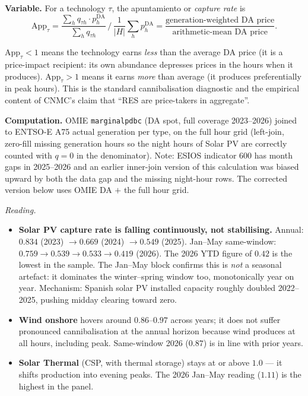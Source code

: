 \documentclass[11pt,a4paper]{article}
\begin{document}
\textbf{Variable.} For a technology $\tau$, the apuntamiento or \emph{capture rate} is
\[
\mathrm{App}_\tau = \frac{\sum_h q_{\tau h} \cdot p_h^{\text{DA}}}{\sum_h q_{\tau h}} \, \Big/ \, \frac{1}{|H|}\sum_h p_h^{\text{DA}}
= \frac{\text{generation-weighted DA price}}{\text{arithmetic-mean DA price}}.
\]

$\mathrm{App}_\tau < 1$ means the technology earns \emph{less} than the average DA price (it is a price-impact recipient: its own abundance depresses prices in the hours when it produces). $\mathrm{App}_\tau > 1$ means it earns \emph{more} than average (it produces preferentially in peak hours). This is the standard cannibalisation diagnostic and the empirical content of CNMC's claim that ``RES are price-takers in aggregate''.

\textbf{Computation.} OMIE \texttt{marginalpdbc} (DA spot, full coverage 2023--2026) joined to ENTSO-E A75 actual generation per type, on the full hour grid (left-join, zero-fill missing generation hours so the night hours of Solar PV are correctly counted with $q = 0$ in the denominator). Note: ESIOS indicator 600 has month gaps in 2025--2026 and an earlier inner-join version of this calculation was biased upward by both the data gap and the missing night-hour rows. The corrected version below uses OMIE DA $+$ the full hour grid.

\begin{table}[H]
\centering\scriptsize
\caption{\textbf{Apuntamiento (RES capture rate), annual and Jan--May same-window.} Generation-weighted divided by arithmetic-mean DA price. \textbf{Sources}: OMIE \texttt{marginalpdbc} (DA spot) + ENTSO-E A75 \texttt{gen\_actual\_per\_type} (generation by PSR type), full hour grid. The annual block is reported only for years with 12 complete months; 2026 is reported only on the Jan--May line.}
\label{tab:apuntamiento}
\setlength{\tabcolsep}{6pt}

\end{table}

\textit{Reading.} \begin{itemize}\setlength{\itemsep}{1pt}
\item \textbf{Solar PV capture rate is falling continuously, not stabilising.} Annual: $0.834$ (2023) $\to 0.669$ (2024) $\to 0.549$ (2025). Jan--May same-window: $0.759 \to 0.539 \to 0.533 \to 0.419$ (2026). The 2026 YTD figure of $0.42$ is the lowest in the sample. The Jan--May block confirms this is \emph{not} a seasonal artefact: it dominates the winter--spring window too, monotonically year on year. Mechanism: Spanish solar PV installed capacity roughly doubled 2022--2025, pushing midday clearing toward zero.
\item \textbf{Wind onshore} hovers around $0.86$--$0.97$ across years; it does not suffer pronounced cannibalisation at the annual horizon because wind produces at all hours, including peak. Same-window 2026 ($0.87$) is in line with prior years.
\item \textbf{Solar Thermal} (CSP, with thermal storage) stays at or above $1.0$ --- it shifts production into evening peaks. The 2026 Jan--May reading ($1.11$) is the highest in the panel.
\end{itemize}
\end{document}
